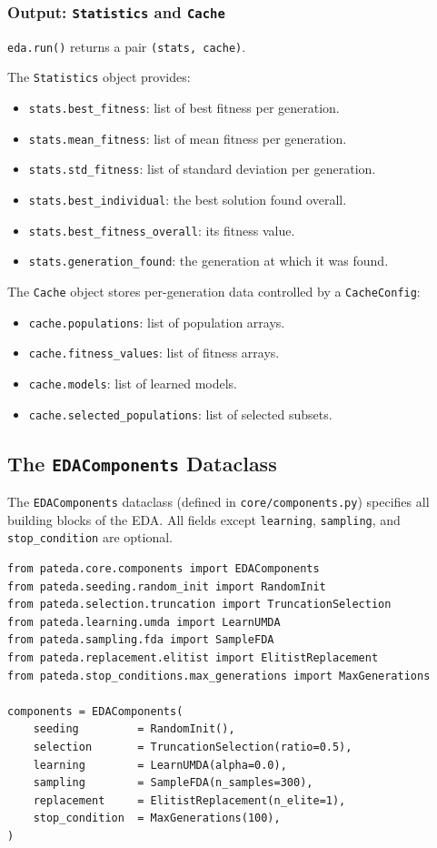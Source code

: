 \documentclass[a4paper,11pt]{article}
\begin{document}
\subsubsection{Output: \texttt{Statistics} and \texttt{Cache}}

\texttt{eda.run()} returns a pair \texttt{(stats, cache)}.

The \texttt{Statistics} object provides:
\begin{itemize}
  \item \texttt{stats.best\_fitness}: list of best fitness per generation.
  \item \texttt{stats.mean\_fitness}: list of mean fitness per generation.
  \item \texttt{stats.std\_fitness}: list of standard deviation per generation.
  \item \texttt{stats.best\_individual}: the best solution found overall.
  \item \texttt{stats.best\_fitness\_overall}: its fitness value.
  \item \texttt{stats.generation\_found}: the generation at which it was found.
\end{itemize}

The \texttt{Cache} object stores per-generation data controlled by a
\texttt{CacheConfig}:
\begin{itemize}
  \item \texttt{cache.populations}: list of population arrays.
  \item \texttt{cache.fitness\_values}: list of fitness arrays.
  \item \texttt{cache.models}: list of learned models.
  \item \texttt{cache.selected\_populations}: list of selected subsets.
\end{itemize}

\subsection{The \texttt{EDAComponents} Dataclass}

The \texttt{EDAComponents} dataclass (defined in \texttt{core/components.py})
specifies all building blocks of the EDA.  All fields except
\texttt{learning}, \texttt{sampling}, and \texttt{stop\_condition} are optional.

\begin{lstlisting}
from pateda.core.components import EDAComponents
from pateda.seeding.random_init import RandomInit
from pateda.selection.truncation import TruncationSelection
from pateda.learning.umda import LearnUMDA
from pateda.sampling.fda import SampleFDA
from pateda.replacement.elitist import ElitistReplacement
from pateda.stop_conditions.max_generations import MaxGenerations

components = EDAComponents(
    seeding         = RandomInit(),
    selection       = TruncationSelection(ratio=0.5),
    learning        = LearnUMDA(alpha=0.0),
    sampling        = SampleFDA(n_samples=300),
    replacement     = ElitistReplacement(n_elite=1),
    stop_condition  = MaxGenerations(100),
)
\end{lstlisting}
\end{document}
